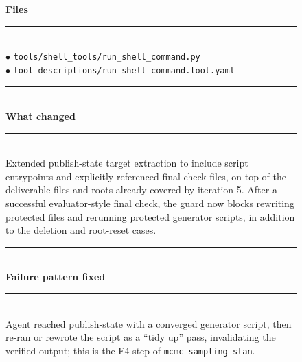 \begin{figure}[t]
    \centering
    \scriptsize
    \begin{tcbraster}[raster columns=2,
                      raster equal height,
                      raster column skip=4pt,
                      raster row skip=0pt,
                      raster left skip=0pt,
                      raster right skip=0pt,
                      boxrule=0.6pt,
                      left=4pt,right=4pt,top=3pt,bottom=3pt,
                      coltitle=white]
        \begin{tcolorbox}[colback=aheSky!18,colframe=aheNavy,colbacktitle=aheNavy,
                          title={\scriptsize\textbf{chg-1, iteration 6, commit \texttt{ff0cf3d}, level: tool implementation}}]
            \textbf{\textcolor{aheNavy}{Files}} \\
            \rule{\linewidth}{0.3pt}\\[1pt]
            $\bullet$ \texttt{tools/shell\_tools/run\_shell\_command.py} \\
            $\bullet$ \texttt{tool\_descriptions/run\_shell\_command.tool.yaml} \\[3pt]
            \rule{\linewidth}{0.3pt}\\
            \textbf{\textcolor{aheNavy}{What changed}} \\
            \rule{\linewidth}{0.3pt}\\[1pt]
            Extended publish-state target extraction to include script entrypoints and explicitly referenced final-check files, on top of the deliverable files and roots already covered by iteration 5. After a successful evaluator-style final check, the guard now blocks rewriting protected files and rerunning protected generator scripts, in addition to the deletion and root-reset cases. \\[3pt]
            \rule{\linewidth}{0.3pt}\\
            \textbf{\textcolor{aheNavy}{Failure pattern fixed}} \\
            \rule{\linewidth}{0.3pt}\\[1pt]
            Agent reached publish-state with a converged generator script, then re-ran or rewrote the script as a ``tidy up'' pass, invalidating the verified output; this is the F4 step of \texttt{mcmc-sampling-stan}. \\[3pt]

\end{tcolorbox}
\end{tcbraster}
\end{figure}
